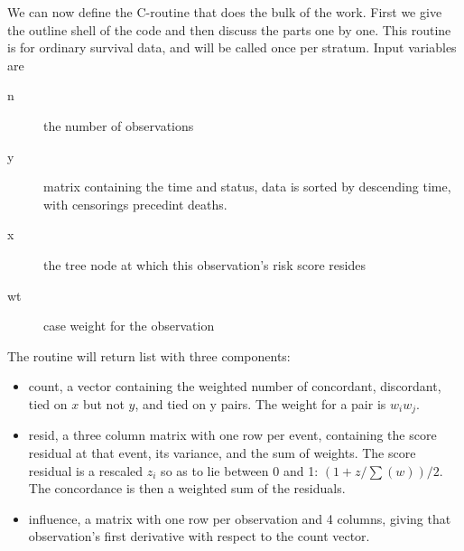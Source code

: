 \documentclass{article}
\begin{document}
We can now define the C-routine that does the bulk of the work.
First we give the outline shell of the code and then discuss the
parts one by one.  This routine  is for ordinary survival data, and
will be called once per stratum.
Input variables are
\begin{description}
  \item[n] the number of observations
  \item[y] matrix containing the time and status, data is sorted by descending 
    time, with censorings precedint deaths.
  \item[x] the tree node at which this observation's risk score resides  %
  \item[wt] case weight for the observation
\end{description}
The routine will return list with three components:
\begin{itemize}
  \item count, a vector containing the weighted number of concordant, 
    discordant, tied on $x$ but not $y$, and tied on y pairs.  
    The weight for a pair is $w_iw_j$.
  \item resid, a three column matrix with one row per event, containing the 
    score residual at that event, its variance, and the sum of weights.
    The score residual is
    a rescaled $z_i$ so as to lie between 0 and 1: $(1+ z/\sum(w))/2$.
    The concordance is then a weighted sum of the residuals.
  \item influence, a matrix with one row per observation and 4 columns, giving
    that observation's first derivative with respect to the count vector.
\end{itemize}    
\end{document}
